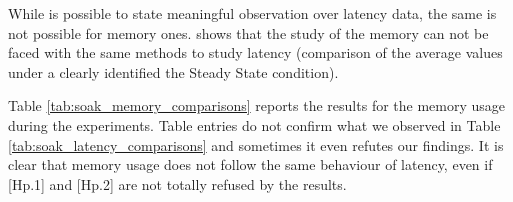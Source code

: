 While is possible to state meaningful observation over latency data, the same is not possible for memory ones. \name shows that the study of the memory can not be faced with the same methods to study latency (comparison of the average values under a clearly identified the Steady State condition). 

Table \ref{tab:soak_memory_comparisons} reports the results for the memory usage during the experiments. Table entries do not confirm what we observed in Table \ref{tab:soak_latency_comparisons} and sometimes it even refutes our findings. It is clear that memory usage does not follow the same behaviour of latency, even if [Hp.1] and [Hp.2] are not totally refused by the results.

\begin{table}[htbp]
	\centering
	\scriptsize
\end{table}
